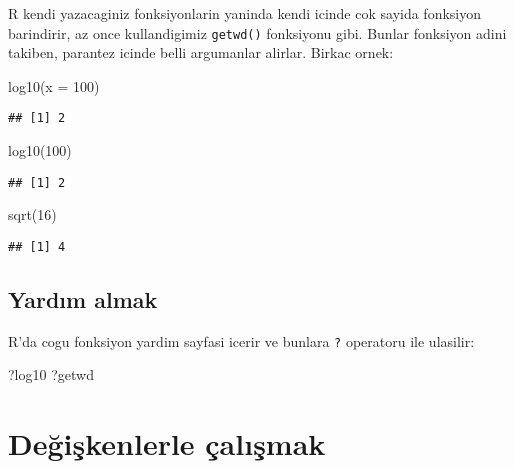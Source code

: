 \documentclass[
]{book}
\newenvironment{Shaded}{\begin{snugshade}}{\end{snugshade}}
\newcommand{\AttributeTok}[1]{\textcolor[rgb]{0.77,0.63,0.00}{#1}}
\newcommand{\DecValTok}[1]{\textcolor[rgb]{0.00,0.00,0.81}{#1}}
\newcommand{\FunctionTok}[1]{\textcolor[rgb]{0.00,0.00,0.00}{#1}}
\newcommand{\NormalTok}[1]{#1}
\begin{document}
R kendi yazacaginiz fonksiyonlarin yaninda kendi icinde cok sayida fonksiyon barindirir, az once kullandigimiz \texttt{getwd()} fonksiyonu gibi. Bunlar fonksiyon adini takiben, parantez icinde belli argumanlar alirlar. Birkac ornek:

\begin{Shaded}
\begin{Highlighting}[]
\FunctionTok{log10}\NormalTok{(}\AttributeTok{x =} \DecValTok{100}\NormalTok{)}
\end{Highlighting}
\end{Shaded}

\begin{verbatim}
## [1] 2
\end{verbatim}

\begin{Shaded}
\begin{Highlighting}[]
\FunctionTok{log10}\NormalTok{(}\DecValTok{100}\NormalTok{)}
\end{Highlighting}
\end{Shaded}

\begin{verbatim}
## [1] 2
\end{verbatim}

\begin{Shaded}
\begin{Highlighting}[]
\FunctionTok{sqrt}\NormalTok{(}\DecValTok{16}\NormalTok{)}
\end{Highlighting}
\end{Shaded}

\begin{verbatim}
## [1] 4
\end{verbatim}

\hypertarget{yardux131m-almak}{%
\subsection{Yardım almak}\label{yardux131m-almak}}

R'da cogu fonksiyon yardim sayfasi icerir ve bunlara \texttt{?} operatoru ile ulasilir:

\begin{Shaded}
\begin{Highlighting}[]
\NormalTok{?log10}
\NormalTok{?getwd}
\end{Highlighting}
\end{Shaded}

\hypertarget{deux11fiux15fkenlerle-uxe7alux131ux15fmak}{%
\section{Değişkenlerle çalışmak}\label{deux11fiux15fkenlerle-uxe7alux131ux15fmak}}
\end{document}
